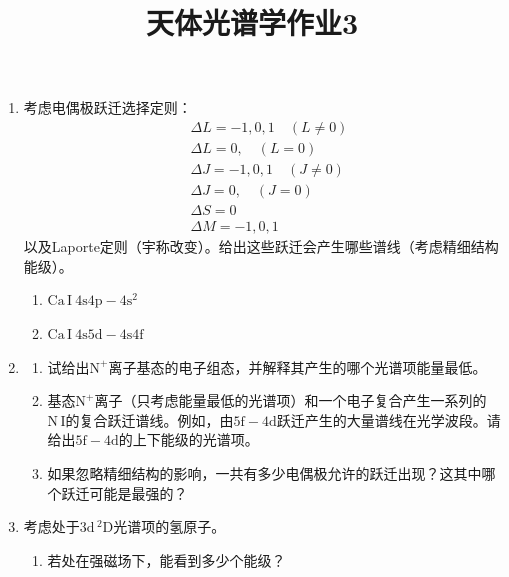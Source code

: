\documentclass[a4paper]{article}
\begin{document}
\title{\textbf{天体光谱学作业3}}
\author{}
\date{}
\maketitle

\begin{enumerate}
    \item[1.]
    考虑电偶极跃迁选择定则：
    \begin{align*}
        &\Delta L = -1, 0, 1\quad (L \neq 0) \\
        &\Delta L = 0, \quad (L = 0) \\
        &\Delta J = -1, 0, 1\quad (J \neq 0) \\
        &\Delta J = 0, \quad (J = 0) \\
        &\Delta S = 0 \\
        &\Delta M = -1, 0, 1
    \end{align*}
    以及Laporte定则（宇称改变）。给出这些跃迁会产生哪些谱线（考虑精细结构能级）。
    \begin{enumerate}
        \item[(a)] $\mathrm{Ca\,I\ 4s 4p - 4s^2}$

        \item[(b)] $\mathrm{Ca\,I\ 4s 5d - 4s 4f}$
    \end{enumerate}

    \bigskip
    \item[2.]
    \begin{enumerate}
        \item[(a)] 试给出$\mathrm{N}^+$离子基态的电子组态，并解释其产生的哪个光谱项能量最低。

        \item[(b)] 基态$\mathrm{N}^+$离子（只考虑能量最低的光谱项）和一个电子复合产生一系列的$\mathrm{N\,I}$的复合跃迁谱线。例如，由$\mathrm{5f}-\mathrm{4d}$跃迁产生的大量谱线在光学波段。请给出$\mathrm{5f}-\mathrm{4d}$的上下能级的光谱项。
        
        \item[(c)] 如果忽略精细结构的影响，一共有多少电偶极允许的跃迁出现？这其中哪个跃迁可能是最强的？
    \end{enumerate}

    \bigskip
    \item[3.]
    考虑处于$\mathrm{3d}\,^2\mathrm{D}$光谱项的氢原子。
    \begin{enumerate}
        \item[(a)] 若处在强磁场下，能看到多少个能级？


\end{enumerate}
\end{enumerate}
\end{document}
